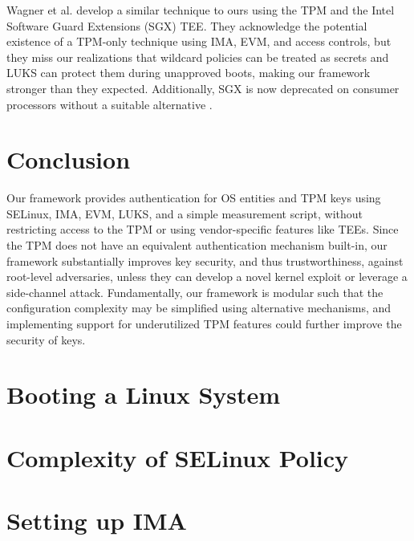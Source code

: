 \documentclass[12pt,letterpaper]{kuthesis}
\newif\ifacm
\newif\iftwocolumn
\newif\iflncs
\newif\ifthesis
\begin{document}
Wagner et al. \cite{Wagner:Distributed-Usage-Control-SGX:2018} develop a similar technique to ours using the TPM and the Intel Software Guard Extensions (SGX) TEE.
They acknowledge the potential existence of a TPM-only technique using IMA, EVM, and access controls,
but they miss our realizations that wildcard policies can be treated as secrets and LUKS can protect them during unapproved boots,
making our framework stronger than they expected.
Additionally, SGX is now deprecated on consumer processors without a suitable alternative \cite{Intel:Core12th-SGX-Deprecation:2025}.

\section{Conclusion}
Our framework provides authentication for OS entities and TPM keys using SELinux, IMA, EVM, LUKS, and a simple measurement script,
without restricting access to the TPM or using vendor-specific features like TEEs.
Since the TPM does not have an equivalent authentication mechanism built-in,
our framework substantially improves key security, and thus trustworthiness, against root-level adversaries,
unless they can develop a novel kernel exploit or leverage a side-channel attack.
Fundamentally, our framework is modular such that the configuration complexity may be simplified using alternative mechanisms,
and implementing support for underutilized TPM features could further improve the security of keys.

%
% 
%
%
\ifacm\fi
\iflncs\fi
\ifthesis\fi


\appendix
\ifthesis\else
  \section{Booting a Linux System}
  
  \section{Complexity of SELinux Policy}\label{appendix:selinux}
  
  \section{Setting up IMA}
  
\fi

\ifacm\iftwocolumn\balance\fi\fi
\end{document}
